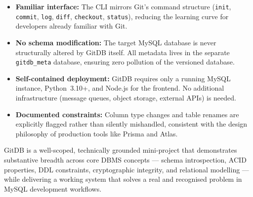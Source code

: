 \documentclass[12pt, a4paper]{article}
\begin{document}
\begin{itemize}[leftmargin=1.5em]

    \item \textbf{Familiar interface:} The CLI mirrors Git's command structure
    (\texttt{init}, \texttt{commit}, \texttt{log}, \texttt{diff},
    \texttt{checkout}, \texttt{status}), reducing the learning curve for
    developers already familiar with Git.

    \item \textbf{No schema modification:} The target MySQL database is never
    structurally altered by GitDB itself. All metadata lives in the separate
    \texttt{gitdb\_meta} database, ensuring zero pollution of the versioned
    database.

    \item \textbf{Self-contained deployment:} GitDB requires only a running
    MySQL instance, Python~3.10+, and Node.js for the frontend. No additional
    infrastructure (message queues, object storage, external APIs) is needed.

    \item \textbf{Documented constraints:} Column type changes and table renames
    are explicitly flagged rather than silently mishandled, consistent with the
    design philosophy of production tools like Prisma and Atlas.

\end{itemize}


\medskip
GitDB is a well-scoped, technically grounded mini-project that demonstrates
substantive breadth across core DBMS concepts --- schema introspection, ACID
properties, DDL constraints, cryptographic integrity, and relational modelling ---
while delivering a working system that solves a real and recognised problem in
MySQL development workflows.
\end{document}
